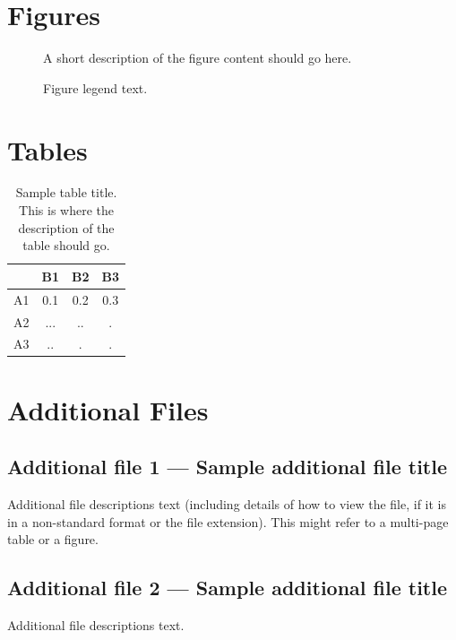 \documentclass{bmcart}
\begin{document}
\begin{backmatter}

\section*{Figures}
  \begin{figure}[h!]
  \caption{
      A short description of the figure content
      should go here.}
      \end{figure}

\begin{figure}[h!]
  \caption{
      Figure legend text.}
      \end{figure}


\section*{Tables}
\begin{table}[h!]
\caption{Sample table title. This is where the description of the table should go.}
      \begin{tabular}{cccc}
        \hline
           & B1  &B2   & B3\\ \hline
        A1 & 0.1 & 0.2 & 0.3\\
        A2 & ... & ..  & .\\
        A3 & ..  & .   & .\\ \hline
      \end{tabular}
\end{table}


\section*{Additional Files}
  \subsection*{Additional file 1 --- Sample additional file title}
    Additional file descriptions text (including details of how to
    view the file, if it is in a non-standard format or the file extension).  This might
    refer to a multi-page table or a figure.

  \subsection*{Additional file 2 --- Sample additional file title}
    Additional file descriptions text.


\end{backmatter}
\end{document}
